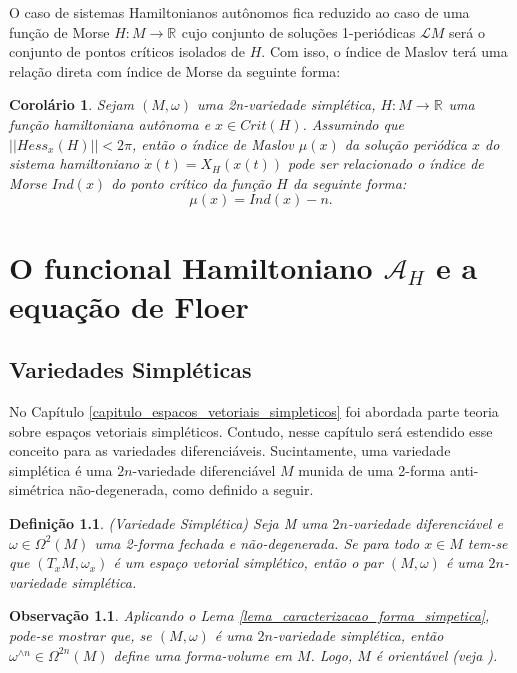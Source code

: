 \documentclass[12pt]{book}
\newtheorem{corolario}[teorema]{Corolário}
\newtheorem{definicao}[teorema]{Definição}
\newtheorem{observacao}[teorema]{Observação}
\newcommand{\funcionalH}{\mathcal{A}_{H}}
\newcommand{\real}[1]{\mathbb{R}^{#1}}
\newcommand{\lacocontrateis}{\mathcal{L}M}
\begin{document}
	O caso de sistemas Hamiltonianos autônomos fica reduzido ao caso de uma função de Morse $H:M\to \real{}$ cujo conjunto de soluções 1-periódicas $\lacocontrateis$ será o conjunto de pontos críticos isolados de $H$. Com isso, o índice de Maslov terá uma relação direta com índice de Morse da seguinte forma:
	
	\begin{corolario}
		Sejam $(M, \omega)$ uma 2n-variedade simplética, $H : M \to \real{}$ uma função hamiltoniana autônoma e $x \in Crit(H)$. Assumindo que $||Hess_{x}(H)|| < 2\pi$, então o índice de Maslov $\mu(x)$ da solução periódica $x$ do sistema hamiltoniano $\dot{x}(t) = X_{H}(x(t))$ pode ser relacionado o índice de Morse $Ind(x)$ do ponto crítico da função $H$ da seguinte forma:
		$$
		\mu(x) = Ind(x) - n.
		$$
	\end{corolario}	
	
	\chapter{O funcional Hamiltoniano $\funcionalH$ e a equação de Floer}
	\section{Variedades Simpléticas}
	
	No Capítulo \ref{capitulo_espacos_vetoriais_simpleticos} foi abordada parte teoria sobre espaços vetoriais simpléticos. Contudo, nesse capítulo será estendido esse conceito para as variedades diferenciáveis. Sucintamente, uma variedade simplética é uma $2n$-variedade diferenciável $M$ munida de uma 2-forma anti-simétrica não-degenerada, como definido a seguir.
	
	\begin{definicao}
		(Variedade Simplética) Seja M uma $2n$-variedade diferenciável e $\omega \in \Omega^{2}(M)$ uma 2-forma fechada e não-degenerada. Se  para todo $x \in M$ tem-se que $(T_{x}M, \omega_{x})$ é um espaço vetorial simplético, então o par $(M, \omega)$ é uma $2n$-variedade simplética.
	\end{definicao}
	
	\begin{observacao}
		Aplicando o Lema \ref{lema_caracterizacao_forma_simpetica}, pode-se mostrar que, se $(M, \omega)$ é uma $2n$-variedade simplética, então $\omega^{\wedge n} \in \Omega^{2n}(M)$ define uma forma-volume em $M$. Logo, $M$ é orientável (veja \cite{warner_manifolds}).
	\end{observacao}
	
\end{document}
